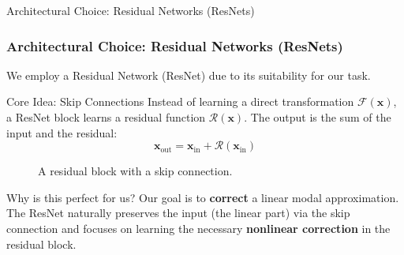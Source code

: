 \documentclass{beamer}
\begin{document}
\begin{frame}{Architectural Choice: Residual Networks (ResNets)}
    \frametitle{Architectural Choice: Residual Networks (ResNets)}
    
    We employ a Residual Network (ResNet) \cite{He_Zhang_Ren_Sun_2015} due to its suitability for our task.
    
    \begin{block}{Core Idea: Skip Connections}
        Instead of learning a direct transformation \( \mathcal{F}(\bm{x}) \), a ResNet block learns a residual function \( \mathcal{R}(\bm{x}) \). The output is the sum of the input and the residual:
        \begin{equation*}
            \bm{x}_{\text{out}} = \bm{x}_{\text{in}} + \mathcal{R}(\bm{x}_{\text{in}})
        \end{equation*}
    \end{block}
    
    \begin{figure}
        \centering
        \caption{A residual block with a skip connection.}
    \end{figure}
    
    \begin{alertblock}{Why is this perfect for us?}
        Our goal is to \textbf{correct} a linear modal approximation. The ResNet naturally preserves the input (the linear part) via the skip connection and focuses on learning the necessary \textbf{nonlinear correction} in the residual block.
    \end{alertblock}
\end{frame}
\end{document}
